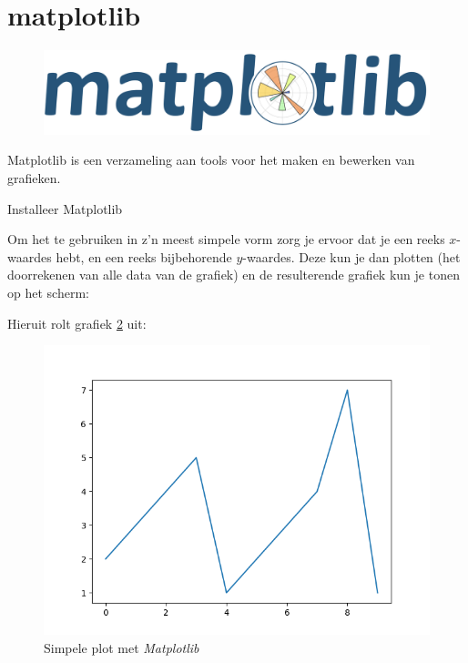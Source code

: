 \newpage
\section{matplotlib}

\begin{figure}[h!]
\centering\includegraphics[scale=0.25]{Pictures/chapter07/matplotlib_logo.png}
\label{fig:mpllogo} %
\end{figure}

Matplotlib is een verzameling aan tools voor het maken en bewerken van grafieken. 
\begin{exercise}
  Installeer Matplotlib
\end{exercise}

Om het te gebruiken in z'n meest simpele vorm zorg je ervoor dat je een reeks $x$-waardes hebt, en een reeks bijbehorende $y$-waardes. Deze kun je dan plotten (het doorrekenen van alle data van de grafiek) en de resulterende grafiek kun je tonen op het scherm:


Hieruit rolt grafiek \ref{fig:plot1} uit:
\begin{figure}[h!]
\centering\includegraphics[scale=0.7]{Pictures/chapter07/plot1.png}
\caption{Simpele plot met \textit{Matplotlib}}
\label{fig:plot1} %
\end{figure}

